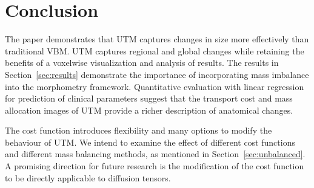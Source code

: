 \documentclass{llncs}
\begin{document}
\section{Conclusion}
The paper demonstrates that UTM captures changes in size more effectively than
traditional VBM. UTM captures regional and global changes while retaining the
benefits of a voxelwise visualization and analysis of results.  The results in
Section~\ref{sec:results} demonstrate the importance of incorporating mass
imbalance into the morphometry framework.  Quantitative evaluation with linear
regression for prediction of clinical parameters suggest that the transport
cost and mass allocation images of UTM provide a richer description of
anatomical changes.

The cost function introduces flexibility and many options to modify the
behaviour of UTM. We intend to examine the effect of different cost functions
and different mass balancing methods, as mentioned in
Section~\ref{sec:unbalanced}.  A promising direction for future research is the
modification of the cost function to be directly applicable to diffusion
tensors.



\end{document}
